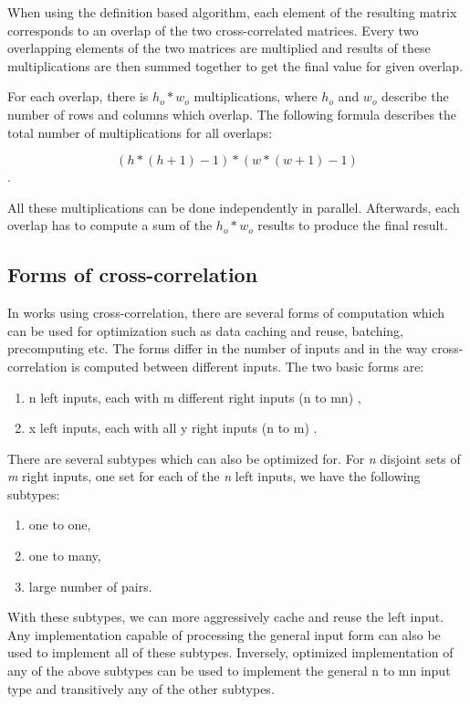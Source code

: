 When using the definition based algorithm, each element of the resulting matrix corresponds to an overlap of the two cross-correlated matrices. Every two overlapping elements of the two matrices are multiplied and results of these multiplications are then summed together to get the final value for given overlap.

For each overlap, there is $h_o * w_o$ multiplications, where $h_o$ and $w_o$ describe the number of rows and columns which overlap. The following formula describes the total number of multiplications for all overlaps:

\[
	(h*(h+1)-1)*(w*(w+1)-1)
\].

All these multiplications can be done independently in parallel. Afterwards, each overlap has to compute a sum of the $h_o * w_o$ results to produce the final result.



\subsection{Forms of cross-correlation}

In works using cross-correlation, there are several forms of computation which can be used for optimization such as data caching and reuse, batching, precomputing etc. The forms differ in the number of inputs and in the way cross-correlation is computed between different inputs. 
The two basic forms are:

\begin{enumerate}
	\item n left inputs, each with m different right inputs (n to mn) \citet{misko} \citet{zhang2015} \citet{Kapinchev2015}, 
	\item x left inputs, each with all y right inputs (n to m) \citet{Clark2011}.
\end{enumerate} 

There are several subtypes which can also be optimized for. For \textit{n} disjoint sets of \textit{m} right inputs, one set for each of the \textit{n} left inputs, we have the following subtypes:

\begin{enumerate}
	\item one to one,
	\item one to many,
	\item large number of pairs.
\end{enumerate}

With these subtypes, we can more aggressively cache and reuse the left input. Any implementation capable of processing the general input form can also be used to implement all of these subtypes.
Inversely, optimized implementation of any of the above subtypes can be used to implement the general n to mn input type and transitively any of the other subtypes.

